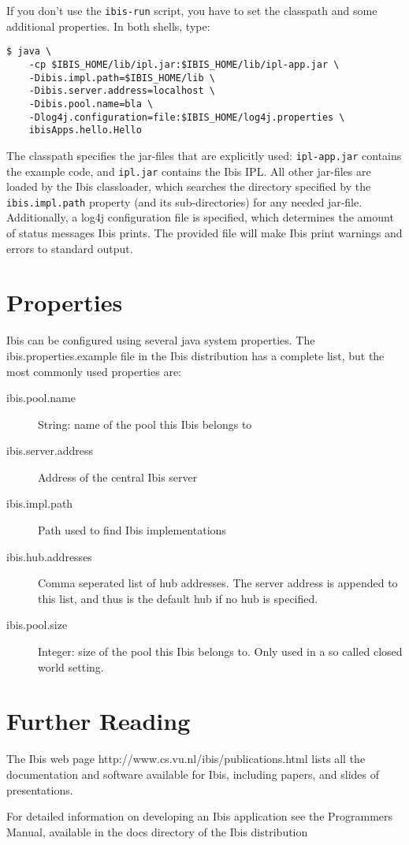 \documentclass[10pt]{article}
\newcommand{\mysection}[1]{\section{#1}\label{#1}}
\begin{document}
If you don't use the \texttt{ibis-run} script, you have to set the classpath
and some additional properties. In both shells, type:

\noindent
{\small
\begin{verbatim}
$ java \
    -cp $IBIS_HOME/lib/ipl.jar:$IBIS_HOME/lib/ipl-app.jar \
    -Dibis.impl.path=$IBIS_HOME/lib \
    -Dibis.server.address=localhost \
    -Dibis.pool.name=bla \
    -Dlog4j.configuration=file:$IBIS_HOME/log4j.properties \
    ibisApps.hello.Hello
\end{verbatim}
}
\noindent
The classpath specifies the jar-files that are explicitly used:
\texttt{ipl-app.jar} contains the example code, and \texttt{ipl.jar} contains
the Ibis IPL. All other jar-files are loaded by the Ibis classloader, which
searches the directory specified by the \texttt{ibis.impl.path} property
(and its sub-directories) for any needed jar-file.
Additionally, a log4j configuration file is specified, which determines the
amount of status messages Ibis prints. The provided file will make Ibis print
warnings and errors to standard output.

\mysection{Properties}

Ibis can be configured using several java system properties. The
ibis.properties.example file in the Ibis distribution has a complete
list, but the most commonly used properties are:

\begin{description}

\item[ibis.pool.name] String: name of the pool this Ibis belongs to
\item[ibis.server.address] Address of the central Ibis server
\item[ibis.impl.path] Path used to find Ibis implementations
\item[ibis.hub.addresses] Comma seperated list of hub addresses. The
server address is appended to this list, and thus is the default hub if
no hub is specified.
\item[ibis.pool.size] Integer: size of the pool this Ibis belongs to.
Only used in a so called closed world setting.

\end{description}

\mysection{Further Reading}

The Ibis web page http://www.cs.vu.nl/ibis/publications.html lists all
the documentation and software available for Ibis, including papers, and
slides of presentations.

For detailed information on developing an Ibis application see the
Programmers Manual, available in the docs directory of the Ibis
distribution
\end{document}
